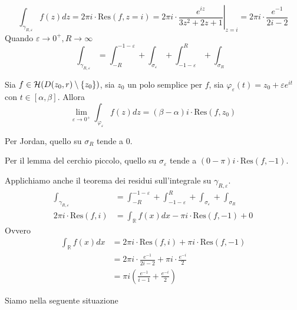 \begin{equation*}
\int _{\gamma _{R,\varepsilon }} f(z)dz=2\pi i\cdot \mathrm{Res} (f,z=i)=2\pi i\cdotp \left. \frac{e^{iz}}{3z^{2} +2z+1}\right| _{z=i} =2\pi i\cdotp \frac{e^{-1}}{2i-2}
\end{equation*}
Quando $\varepsilon \rightarrow 0^{+} ,R\rightarrow \infty $
\begin{equation*}
\int _{\gamma _{R,\varepsilon }} =\int ^{-1-\varepsilon }_{-R} +\int _{\sigma _{\varepsilon }} +\int ^{R}_{-1-\varepsilon } +\int _{\sigma _{R}}
\end{equation*}
\begin{thm}
 Sia $f\in \mathcal{H} ( D( z_{0} ,r) \setminus \{z_{0}\})$, sia $z_{0}$ un polo semplice per $f$, sia $\varphi _{\varepsilon }( t) =z_{0} +\varepsilon e^{it}$ con $t\in [ \alpha ,\beta ]$. Allora
\begin{equation*}
\lim _{\varepsilon \rightarrow 0^{+}}\int _{\varphi _{\varepsilon }} f( z) dz=( \beta -\alpha ) i\cdotp \mathrm{Res}( f,z_{0})
\end{equation*}
\end{thm}
Per Jordan, quello su $\sigma _{R}$ tende a $0$.

Per il lemma del cerchio piccolo, quello su $\sigma _{\varepsilon }$ tende a $( 0-\pi ) i\cdotp \mathrm{Res}( f,-1)$.

Applichiamo anche il teorema dei residui sull'integrale su $\gamma _{R,\varepsilon }$.
\begin{equation*}
\begin{aligned}
\int _{\gamma _{R,\varepsilon }} & =\int ^{-1-\varepsilon }_{-R} +\int ^{R}_{-1-\varepsilon } +\int _{\sigma _{\varepsilon }} +\int _{\sigma _{R}}\\
2\pi i\cdotp \mathrm{Res} (f,i) & =\int _{\mathbb{R}} f( x) dx-\pi i\cdotp \mathrm{Res}( f,-1) +0
\end{aligned}
\end{equation*}
Ovvero
\begin{equation*}
\begin{aligned}
\int _{\mathbb{R}} f( x) dx & =2\pi i\cdotp \mathrm{Res} (f,i)+\pi i\cdotp \mathrm{Res}( f,-1)\\
 & =2\pi i\cdotp \frac{e^{-1}}{2i-2} +\pi i\cdotp \frac{e^{-i}}{2}\\
 & =\pi i\left(\frac{e^{-1}}{i-1} +\frac{e^{-i}}{2}\right)
\end{aligned}
\end{equation*}
\Soluzione

Siamo nella seguente situazione



